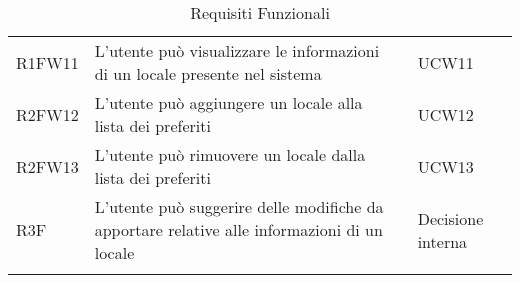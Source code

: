 \begin{longtable}{ m{}<{\centering}  m{}<{\centering}  m{}<{\centering}  m{}<{\centering}}
	R1FW11 & L’utente può visualizzare le informazioni di un locale presente nel sistema & \Ob & UCW11\\	 	 	 	

	R2FW12 & L’utente può aggiungere un locale alla lista dei preferiti & \De &  UCW12\\

	R2FW13 & L’utente può rimuovere un locale dalla lista dei preferiti & \De & UCW13\\

	R3F & L’utente può suggerire delle modifiche da apportare relative alle informazioni di un locale & \Fa & Decisione interna\\

	\caption{Requisiti Funzionali}
\end{longtable}

\clearpage